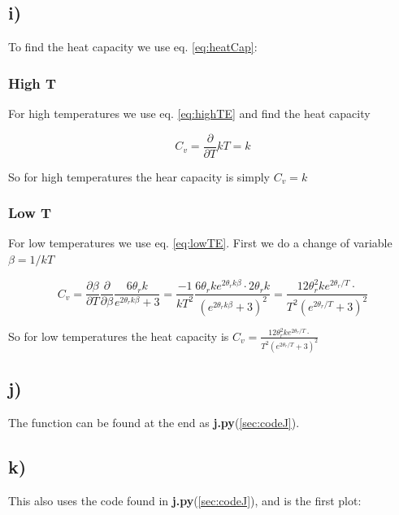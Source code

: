 \documentclass[a4paper,norsk, 10pt]{article}
\newcommand{\pd}[2]{\frac{\partial #1}{\partial #2}}
\begin{document}
\subsection{i)}

To find the heat capacity we use eq. \eqref{eq:heatCap}:

\subsubsection{High T}
For high temperatures we use eq. \eqref{eq:highTE} and find the heat capacity

\begin{equation}
C_v = \pd{}{T} kT = k
\end{equation}

So for high temperatures the hear capacity is simply $C_v = k$

\subsubsection{Low T}
For low temperatures we use eq. \eqref{eq:lowTE}. First we do a change of variable $\beta = 1/kT$

\begin{equation}
C_v = \pd{\beta}{T}\pd{}{\beta} \frac{6\theta_r k}{e^{2\theta_rk\beta} + 3} = \frac{-1}{kT^2}\frac{6\theta_r k e^{2\theta_rk\beta}\cdot 2\theta_r k }{\left(e^{2\theta_rk\beta} + 3\right)^2} = 
\frac{12\theta_r^2 k e^{2\theta_r/T}\cdot  }{T^2\left(e^{2\theta_r/T} + 3\right)^2}
\end{equation}

So for low temperatures the heat capacity is $C_v = \frac{12\theta_r^2 k e^{2\theta_r/T}\cdot  }{T^2\left(e^{2\theta_r/T} + 3\right)^2}$

\subsection{j)}
The function can be found at the end as \textbf{j.py}(\ref{sec:codeJ}).

\subsection{k)}
This also uses the code found in \textbf{j.py}(\ref{sec:codeJ}), and is the first plot:
\end{document}
